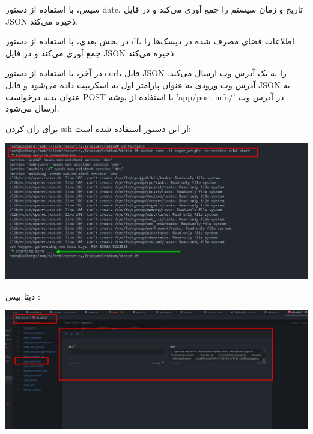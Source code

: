 \documentclass[oneside]{report}
\begin{document}
سپس، با استفاده از دستور date، تاریخ و زمان سیستم را جمع آوری می‌کند و در فایل JSON ذخیره می‌کند.

در بخش بعدی، با استفاده از دستور df، اطلاعات فضای مصرف شده در دیسک‌ها را جمع آوری می‌کند و در فایل JSON ذخیره می‌کند.

در آخر، با استفاده از دستور curl، فایل JSON را به یک آدرس وب ارسال می‌کند. آدرس وب ورودی به عنوان پارامتر اول به اسکریپت داده می‌شود و فایل JSON به عنوان بدنه درخواست POST با استفاده از پوشه 'app/post-info/' در آدرس وب ارسال می‌شود.

برای ران کردن ssh  از این دستور استفاده شده است:
\begin{center}
    \includegraphics[height=0.5\linewidth]{run_ssh.png}
\end{center}
دیتا بیس :
\begin{center}
    \includegraphics[height=0.5\linewidth]{database.png}
\end{center}
\end{document}
